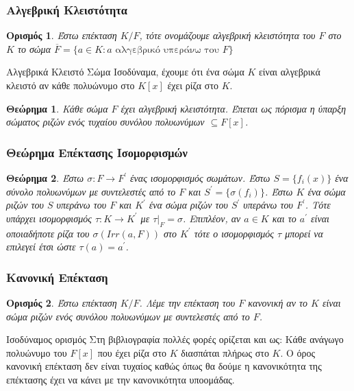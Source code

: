 \documentclass{beamer}
\newtheorem{thrm}{Θεώρημα}
\newtheorem*{defn}{Ορισμός}
\begin{document}
\begin{frame}
    \frametitle{Αλγεβρική Κλειστότητα}
    \begin{defn}
    Έστω επέκταση $K/F$, τότε ονομάζουμε αλγεβρική κλειστότητα του $F$ στο $K$ το σώμα $\overline{F} = \{a \in K: a \text{ αλγεβρικό υπεράνω του } F\}$
    \end{defn}
    \pause
    \begin{block}{Αλγεβρικά Κλειστό Σώμα}
    Ισοδύναμα, έχουμε ότι ένα σώμα $K$ είναι αλγεβρικά κλειστό αν κάθε πολυώνυμο στο $K[x]$ έχει ρίζα στο $K$. 
    \end{block}
    \pause
    \begin{thrm}
        Κάθε σώμα $F$ έχει αλγεβρική κλειστότητα.
        Έπεται ως πόρισμα η ύπαρξη σώματος ριζών ενός τυχαίου συνόλου πολυωνύμων $\subseteq F[x]$. %
    \end{thrm}
\end{frame}

\begin{frame}
    \frametitle{Θεώρημα Επέκτασης Ισομορφισμών}
    \begin{thrm}
    	Έστω $\sigma : F \rightarrow F^{\prime}$ ένας ισομορφισμός σωμάτων. Έστω $S = \{f_i (x)\}$ ένα σύνολο πολυωνύμων με συντελεστές από το $F$ και $S^{\prime} = \{\sigma (f_i)\}$. Έστω $K$ ένα σώμα ριζών του $S$ υπεράνω του $F$ και $K^{\prime}$ ένα σώμα ριζών του $S^{\prime}$ υπεράνω του $F^{\prime}$. Τότε υπάρχει ισομορφισμός $\tau : K \rightarrow K^{\prime}$ με $\tau|_F = \sigma$. Επιπλέον, αν $a \in K$ και το $a^{\prime}$ είναι οποιαδήποτε ρίζα του $\sigma(Irr(a,F))$ στο $K^{\prime}$ τότε ο ισομορφισμός $\tau$ μπορεί να επιλεγεί έτσι ώστε $\tau(a) = a^{\prime}$.

    \end{thrm}
    
\end{frame}

\begin{frame}
    \frametitle{Κανονική Επέκταση}
    \begin{defn}
    Έστω επέκταση $K/F$. Λέμε την επέκταση του $F$ κανονική αν το $K$ είναι σώμα ριζών ενός συνόλου πολυωνύμων με συντελεστές από το $F$.
    \end{defn}
    \pause
    \begin{block}{Ισοδύναμος ορισμός}
    Στη βιβλιογραφία πολλές φορές ορίζεται και ως: Κάθε ανάγωγο πολυώνυμο του $F[x]$ που έχει ρίζα στο $K$ διασπάται πλήρως στο $K$. Ο όρος κανονική επέκταση δεν είναι τυχαίος καθώς όπως θα δούμε η κανονικότητα της επέκτασης έχει να κάνει με την κανονικότητα υποομάδας.
    \end{block}
\end{frame}
\end{document}
